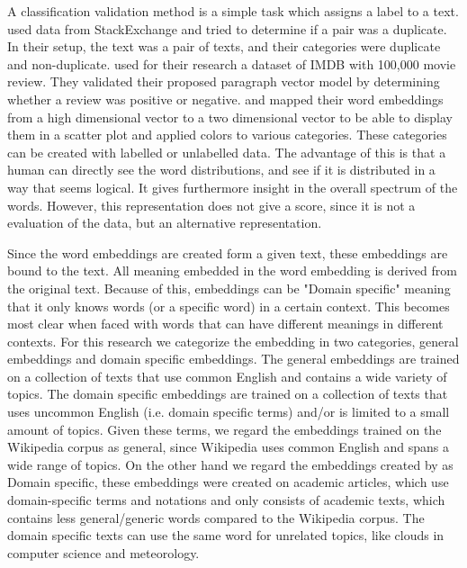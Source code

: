 \documentclass[../../Thesis.tex]{subfiles}
\begin{document}
\begin{jumpin}
A classification validation method is a simple task which assigns a label to a text. \citet{lau2016empirical} used data from StackExchange and tried to determine if a pair was a duplicate. In their setup, the text was a pair of texts, and their categories were duplicate and non-duplicate. \citet{le2014distributed} used for their research a dataset of IMDB with 100,000 movie review. They validated their proposed paragraph vector model by determining whether a review was positive or negative.
\citet{dai2015document} and \citet{hinton2003stochastic} mapped their word embeddings from a high dimensional vector to a two dimensional vector to be able to display them in a scatter plot and applied colors to various categories. These categories can be created with labelled or unlabelled data. The advantage of this is that a human can directly see the word distributions, and see if it is distributed in a way that seems logical. It gives furthermore insight in the overall spectrum of the words. However, this representation does not give a score, since it is not a evaluation of the data, but an alternative representation. 
\end{jumpin}
Since the word embeddings are created form a given text, these embeddings are bound to the text. All meaning embedded in the word embedding is derived from the original text. Because of this, embeddings can be "Domain specific" meaning that it only knows words (or a specific word) in a certain context. This becomes most clear when faced with words that can have different meanings in different contexts. For this research we categorize the embedding in two categories, general embeddings and domain specific embeddings. The general embeddings are trained on a collection of texts that use common English and contains a wide variety of topics. The domain specific embeddings are trained on a collection of texts that uses uncommon English (i.e. domain specific terms) and/or is limited to a small amount of topics. Given these terms, we regard the embeddings trained on the Wikipedia corpus\cite{lai2016generate, pennington2014glove, dai2015document, lau2016empirical, schnabel2015evaluation} as general, since Wikipedia uses common English and spans a wide range of topics. On the other hand we regard the embeddings created by \citet{Truong2017Thesis} as Domain specific, these embeddings were created on academic articles, which use domain-specific terms and notations and only consists of academic texts, which contains less general/generic words compared to the Wikipedia corpus. The domain specific texts can use the same word for unrelated topics, like clouds in computer science and meteorology.
\end{document}

